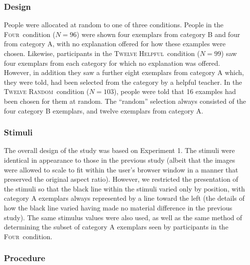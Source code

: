 \documentclass[doc,apacite]{apa6}
\newcommand{\random}{\textsc{Twelve Random}}
\newcommand{\helpful}{\textsc{Twelve Helpful}}
\newcommand{\neutral}{\textsc{Four}}
\begin{document}
\subsubsection{Design}

People were allocated at random to one of three conditions.
People in the \neutral\ condition ($N=96$) were shown four exemplars from
category B and four from category A, with no explanation offered for how these
examples were chosen.
%
Likewise, participants in the \helpful\ condition ($N=99$) saw four
exemplars from each category for which no explanation was offered. However, in
addition they saw a further eight exemplars from category A which, they
were told, had been selected from the category by a helpful teacher.
%
In the \random\ condition ($N=103$), people were told that 16 examples had been
chosen for them at random. The ``random'' selection always consisted of the four
category B exemplars, and twelve exemplars from category A.

\subsubsection{Stimuli}

The overall design of the study was based on Experiment 1.
%
The stimuli were identical in appearance
to those in the previous study (albeit that the images were allowed to
scale to fit within the user's browser window in a manner that preserved the
original aspect ratio).
%
However, we restricted the presentation of the stimuli so that the black line
within the stimuli varied only by position, with category A exemplars always
represented by a line toward the left (the details of how the black line varied
having made no material difference in the previous study).
%
The same stimulus values were also used, as well as the same method of
determining the subset of category A exemplars seen by participants in the
\neutral\ condition.

\subsubsection{Procedure}
\end{document}
